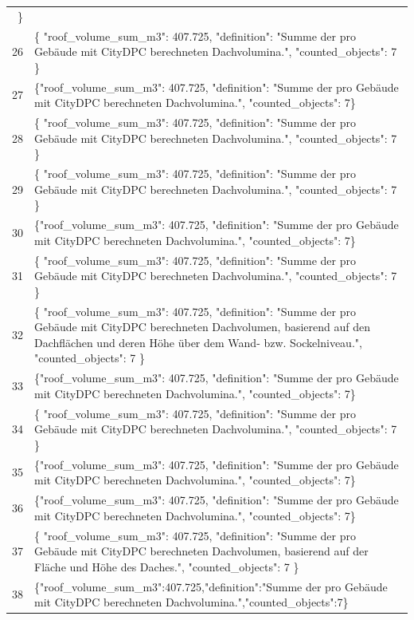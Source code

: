 \documentclass[a4paper,11pt]{article}
\begin{document}
\begin{table}[ht]
\begin{tabular}{r p{12cm}}
\} \\
26 & \{
  "roof\_volume\_sum\_m3": 407.725,
  "definition": "Summe der pro Gebäude mit CityDPC berechneten Dachvolumina.",
  "counted\_objects": 7
\} \\
27 & \{"roof\_volume\_sum\_m3": 407.725, "definition": "Summe der pro Gebäude mit CityDPC berechneten Dachvolumina.", "counted\_objects": 7\} \\
28 & \{
  "roof\_volume\_sum\_m3": 407.725,
  "definition": "Summe der pro Gebäude mit CityDPC berechneten Dachvolumina.",
  "counted\_objects": 7
\} \\
29 & \{
  "roof\_volume\_sum\_m3": 407.725,
  "definition": "Summe der pro Gebäude mit CityDPC berechneten Dachvolumina.",
  "counted\_objects": 7
\} \\
30 & \{"roof\_volume\_sum\_m3": 407.725, "definition": "Summe der pro Gebäude mit CityDPC berechneten Dachvolumina.", "counted\_objects": 7\} \\
31 & \{
  "roof\_volume\_sum\_m3": 407.725,
  "definition": "Summe der pro Gebäude mit CityDPC berechneten Dachvolumina.",
  "counted\_objects": 7
\} \\
32 & \{
  "roof\_volume\_sum\_m3": 407.725,
  "definition": "Summe der pro Gebäude mit CityDPC berechnet­en Dachvolumen, basierend auf den Dachflächen und deren Höhe über dem Wand- bzw. Sockelniveau.",
  "counted\_objects": 7
\} \\
33 & \{"roof\_volume\_sum\_m3": 407.725, "definition": "Summe der pro Gebäude mit CityDPC berechneten Dachvolumina.", "counted\_objects": 7\} \\
34 & \{
  "roof\_volume\_sum\_m3": 407.725,
  "definition": "Summe der pro Gebäude mit CityDPC berechneten Dachvolumina.",
  "counted\_objects": 7
\} \\
35 & \{"roof\_volume\_sum\_m3": 407.725, "definition": "Summe der pro Gebäude mit CityDPC berechneten Dachvolumina.", "counted\_objects": 7\} \\
36 & \{"roof\_volume\_sum\_m3": 407.725, "definition": "Summe der pro Gebäude mit CityDPC berechneten Dachvolumina.", "counted\_objects": 7\} \\
37 & \{
  "roof\_volume\_sum\_m3": 407.725,
  "definition": "Summe der pro Gebäude mit CityDPC berechnet​en Dachvolumen, basierend auf der Fläche und Höhe des Daches.",
  "counted\_objects": 7
\} \\
38 & \{"roof\_volume\_sum\_m3":407.725,"definition":"Summe der pro Gebäude mit CityDPC berechneten Dachvolumina.","counted\_objects":7\} \\

\end{tabular}
\end{table}
\end{document}
